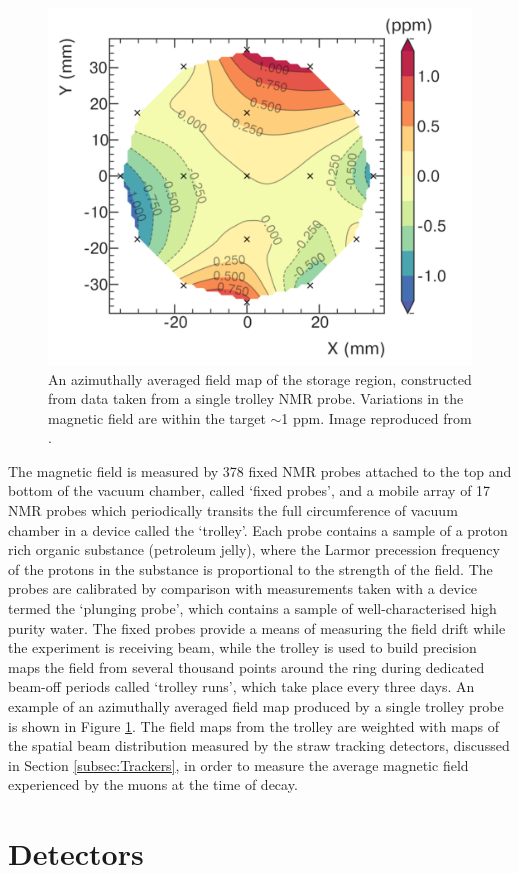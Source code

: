 \begin{figure}[t!]
\centering{}
\includegraphics[trim={0 0 0 0},clip,width=.69\textwidth]{Images/Chapter3/TrolleyMap.png}
\caption{An azimuthally averaged field map of the storage region, constructed from data taken from a single trolley NMR probe. Variations in the magnetic field are within the target $\sim$1 ppm. Image reproduced from \cite{Field}.}
\label{fig:Trolley}
\end{figure}

The magnetic field is measured by 378 fixed NMR probes attached to the top and bottom of the vacuum chamber, called `fixed probes', and a mobile array of 17 NMR probes which periodically transits the full circumference of vacuum chamber in a device called the `trolley'. Each probe contains a sample of a proton rich organic substance (petroleum jelly), where the Larmor precession frequency of the protons in the substance is proportional to the strength of the field. The probes are calibrated by comparison with measurements taken with a device termed the `plunging probe', which contains a sample of well-characterised high purity water. The fixed probes provide a means of measuring the field drift while the experiment is receiving beam, while the trolley is used to build precision maps the field from several thousand points around the ring during dedicated beam-off periods called `trolley runs', which take place every three days. An example of an azimuthally averaged field map produced by a single trolley probe is shown in Figure \ref{fig:Trolley}. The field maps from the trolley are weighted with maps of the spatial beam distribution measured by the straw tracking detectors, discussed in Section \ref{subsec:Trackers}, in order to measure the average magnetic field experienced by the muons at the time of decay.
%
\section{Detectors}\label{sec:Detectors}

